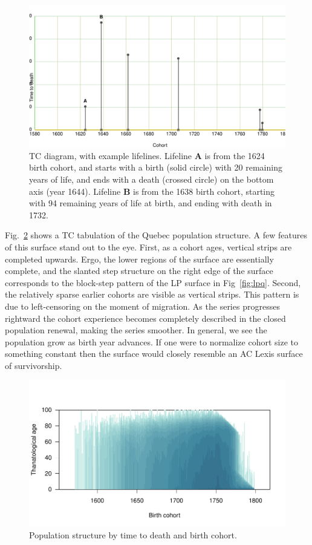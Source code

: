 \documentclass{bmcart}
\begin{document}
\begin{figure}
\centering
\includegraphics[scale=.6]{Figures/TCdiagram.pdf}
\caption{TC diagram, with example lifelines. Lifeline \textbf{A} is from the 1624 birth cohort, and starts with a birth (solid circle) with 20 remaining years of life, and ends with a death (crossed circle) on the bottom axis (year 1644). Lifeline \textbf{B} is from the 1638 birth cohort, starting with 94 remaining years of life at birth, and ending with death in 1732.}
\label{fig:tcd}
\end{figure}

Fig.~\ref{fig:tcq} shows a TC tabulation of the Quebec population structure. A few features of this surface stand out to the eye. First, as a cohort ages, vertical strips are completed upwards. Ergo, the lower regions of the surface are essentially complete, and the slanted step structure on the right edge of the surface corresponds to the block-step pattern of the LP surface in Fig~\ref{fig:lpq}. Second, the relatively sparse earlier cohorts are visible as vertical strips. This pattern is due to left-censoring on the moment of migration. As the series progresses rightward the cohort experience becomes completely described in the closed population renewal, making the series smoother. In general, we see the population grow as birth year advances. If one were to normalize cohort size to something constant then the surface would closely resemble an AC Lexis surface of survivorship.

\begin{figure}
\includegraphics[scale=.9]{Figures/QuebecTC.pdf}
\caption{Population structure by time to death and birth cohort.}
\label{fig:tcq}
\end{figure}
\end{document}
